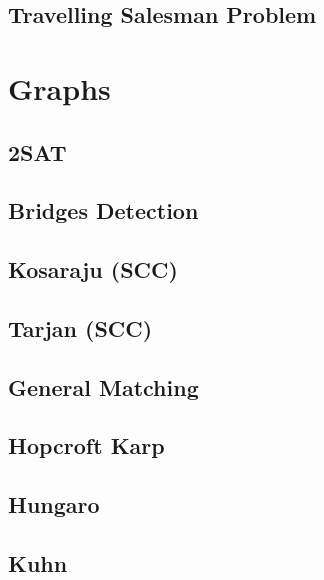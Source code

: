 \subsection{Travelling Salesman Problem}
\raggedbottom
\hrulefill
\newpage

\section{Graphs}
\subsection{2SAT}
\raggedbottom
\hrulefill
\subsection{Bridges Detection}
\raggedbottom
\hrulefill
\subsection{Kosaraju (SCC)}
\raggedbottom
\hrulefill
\subsection{Tarjan (SCC)}
\raggedbottom
\hrulefill
\subsection{General Matching}
\raggedbottom
\hrulefill
\subsection{Hopcroft Karp}
\raggedbottom
\hrulefill
\subsection{Hungaro}
\raggedbottom
\hrulefill
\subsection{Kuhn}
\raggedbottom
\hrulefill
